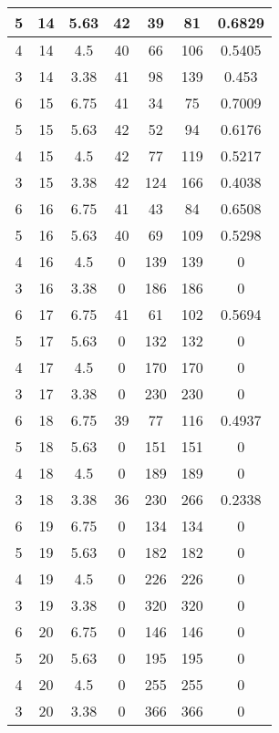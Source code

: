\documentclass[letterpaper, 12pt]{article}
\begin{document}
\begin{longtable}{|c|c|c|c|c|c|c|}
\hline
5 & 14 & 5.63 & 42 & 39 & 81 & 0.6829 \\
\hline
4 & 14 & 4.5 & 40 & 66 & 106 & 0.5405 \\
\hline
3 & 14 & 3.38 & 41 & 98 & 139 & 0.453 \\
\hline
6 & 15 & 6.75 & 41 & 34 & 75 & 0.7009 \\
\hline
5 & 15 & 5.63 & 42 & 52 & 94 & 0.6176 \\
\hline
4 & 15 & 4.5 & 42 & 77 & 119 & 0.5217 \\
\hline
3 & 15 & 3.38 & 42 & 124 & 166 & 0.4038 \\
\hline
6 & 16 & 6.75 & 41 & 43 & 84 & 0.6508 \\
\hline
5 & 16 & 5.63 & 40 & 69 & 109 & 0.5298 \\
\hline
4 & 16 & 4.5 & 0 & 139 & 139 & 0 \\
\hline
3 & 16 & 3.38 & 0 & 186 & 186 & 0 \\
\hline
6 & 17 & 6.75 & 41 & 61 & 102 & 0.5694 \\
\hline
5 & 17 & 5.63 & 0 & 132 & 132 & 0 \\
\hline
4 & 17 & 4.5 & 0 & 170 & 170 & 0 \\
\hline
3 & 17 & 3.38 & 0 & 230 & 230 & 0 \\
\hline
6 & 18 & 6.75 & 39 & 77 & 116 & 0.4937 \\
\hline
5 & 18 & 5.63 & 0 & 151 & 151 & 0 \\
\hline
4 & 18 & 4.5 & 0 & 189 & 189 & 0 \\
\hline
3 & 18 & 3.38 & 36 & 230 & 266 & 0.2338 \\
\hline
6 & 19 & 6.75 & 0 & 134 & 134 & 0 \\
\hline
5 & 19 & 5.63 & 0 & 182 & 182 & 0 \\
\hline
4 & 19 & 4.5 & 0 & 226 & 226 & 0 \\
\hline
3 & 19 & 3.38 & 0 & 320 & 320 & 0 \\
\hline
6 & 20 & 6.75 & 0 & 146 & 146 & 0 \\
\hline
5 & 20 & 5.63 & 0 & 195 & 195 & 0 \\
\hline
4 & 20 & 4.5 & 0 & 255 & 255 & 0 \\
\hline
3 & 20 & 3.38 & 0 & 366 & 366 & 0 \\
\hline
\end{longtable}
\end{document}
